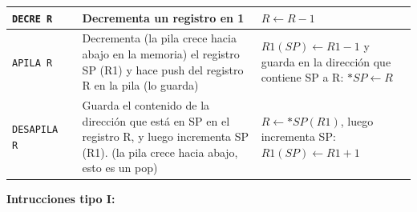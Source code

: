 \documentclass{article}
\begin{document}
\begin{longtable}{|p{}|p{}|p{}|p{}|}
  \hline
  \texttt{DECRE R}     &     & Decrementa un registro en 1                                        & $R \leftarrow R - 1$                       \\
  \hline
  \texttt{APILA R}     &     & Decrementa (la pila crece hacia abajo en la memoria) el registro SP (R1) y hace push del registro R en la pila (lo guarda)                                                                    & $R1 (SP) \leftarrow R1 - 1$ y guarda en la dirección que contiene SP a R:  $*SP \leftarrow R$                       \\
  \hline
  \texttt{DESAPILA R}  &     & Guarda el contenido de la dirección que está en SP en el registro R, y luego incrementa SP (R1). (la pila crece hacia abajo, esto es un pop)                                                  & $R \leftarrow *SP(R1)$, luego incrementa SP: $R1(SP) \leftarrow  R1 + 1 $                                           \\
  \hline
\end{longtable}

\textbf{Intrucciones tipo I:}
\end{document}
